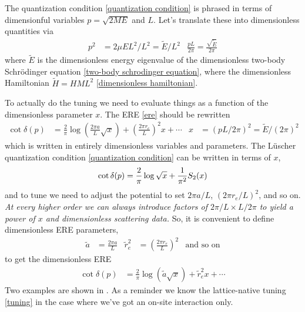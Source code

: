 The quantization condition \eqref{quantization condition} is phrased in terms of dimensionful variables $p=\sqrt{2ME}$ and $L$.
Let's translate these into dimensionless quantities via
\begin{align}
    p^2 &= 2 \mu  E L^2 / L^2 = \tilde{E} / L^2
    &
    \frac{pL}{2\pi} = \frac{\sqrt{\tilde{E}}}{2\pi}
\end{align}
where $\tilde{E}$ is the dimensionless energy eigenvalue of the dimensionless two-body Schr\"{o}dinger equation \eqref{two-body schrodinger equation}, where the dimensionless Hamiltonian $\tilde{H}=H ML^2$ \eqref{dimensionless hamiltonian}.

To actually do the tuning we need to evaluate things as a function of the dimensionless parameter $x$.
The ERE \eqref{ere} should be rewritten
\begin{align}
    \cot \delta(p)
    &=
    \frac{2}{\pi} \log\left(\frac{2\pi a}{L} \sqrt{x}\right)
    +
    \left(\frac{2\pi r_e }{L}\right)^2 x
    +
    \cdots
    &
    x&=(pL/2\pi)^2=\tilde{E} / (2\pi)^2
    \label{eq:ere dimensionless}
\end{align}
which is written in entirely dimensionless variables and parameters.
The L\"{u}scher quantization condition \eqref{quantization condition} can be written in terms of $x$,
\begin{align}
    \cot \delta(p) = \frac{2}{\pi} \log \sqrt{x} + \frac{1}{\pi^2} S_2(x)
	\label{eq:quantization condition dimensionless}
\end{align}
and to tune we need to adjust the potential to set $2\pi a/L$, $(2\pi r_e/L)^2$, and so on.
\emph{At every higher order we can always introduce factors of $2\pi/L\times L/2\pi$ to yield a power of $x$ and dimensionless scattering data.}
So, it is convenient to define dimensionless ERE parameters,
\begin{align}
    \tilde{a} &= \frac{2 \pi a}{L}
    &
    \tilde{r}_e^2 &= \left(\frac{2 \pi r_e}{L}\right)^2
    &
    \text{and so on}
	\label{eq:dimensionless ere parameters}
\end{align}
to get the dimensionless ERE
\begin{align}
    \cot \delta(p)
    &=
	\frac{2}{\pi} \log\left(\tilde{a} \sqrt{x}\right)
    +
	\tilde{r}_e^2 x
    +
    \cdots
    \label{eq:ere dimensionless}
\end{align}
Two examples are shown in .
As a reminder we know the lattice-native tuning \eqref{tuning} in the case where we've got an on-site interaction only.

